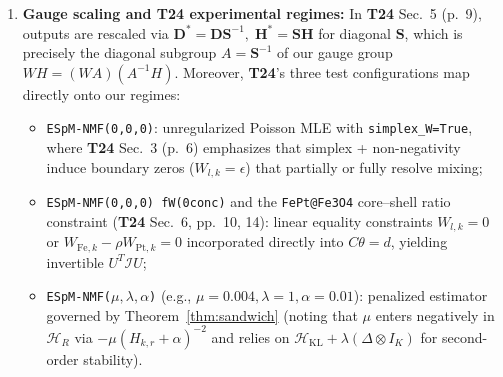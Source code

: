 \documentclass[11pt,a4paper]{article}
\theoremstyle{plain}
\theoremstyle{definition}
\theoremstyle{remark}
\newcommand{\cI}{\mathcal{I}}
\newcommand{\cH}{\mathcal{H}}
\newcommand{\kron}{\otimes}
\begin{document}
\begin{enumerate}[leftmargin=1.5em]
    \item \textbf{Gauge scaling and \textbf{T24} experimental regimes:} In \textbf{T24} Sec.~5 (p.~9), outputs are rescaled via $\boldsymbol{D}^* = \boldsymbol{D}\boldsymbol{S}^{-1},\; \boldsymbol{H}^* = \boldsymbol{S}\boldsymbol{H}$ for diagonal $\boldsymbol{S}$, which is precisely the diagonal subgroup $A = \boldsymbol{S}^{-1}$ of our gauge group $WH = (WA)(A^{-1}H)$. Moreover, \textbf{T24}'s three test configurations map directly onto our regimes:
    \begin{itemize}[leftmargin=1.2em]
        \item \texttt{ESpM-NMF(0,0,0)}: unregularized Poisson MLE with \texttt{simplex\_W=True}, where \textbf{T24} Sec.~3 (p.~6) emphasizes that simplex + non-negativity induce boundary zeros ($W_{l,k}=\epsilon$) that partially or fully resolve mixing;
        \item \texttt{ESpM-NMF(0,0,0) fW(0conc)} and the \texttt{FePt@Fe3O4} core--shell ratio constraint (\textbf{T24} Sec.~6, pp.~10, 14): linear equality constraints $W_{l,k}=0$ or $W_{\text{Fe},k} - \rho W_{\text{Pt},k} = 0$ incorporated directly into $C\theta = d$, yielding invertible $U^T \cI U$;
        \item \texttt{ESpM-NMF($\mu,\lambda,\alpha$)} (e.g., $\mu=0.004, \lambda=1, \alpha=0.01$): penalized estimator governed by Theorem~\ref{thm:sandwich} (noting that $\mu$ enters negatively in $\cH_R$ via $-\mu(H_{k,r}+\alpha)^{-2}$ and relies on $\cH_{\text{KL}} + \lambda(\Delta \kron I_K)$ for second-order stability).
    \end{itemize}
\end{enumerate}
\end{document}
